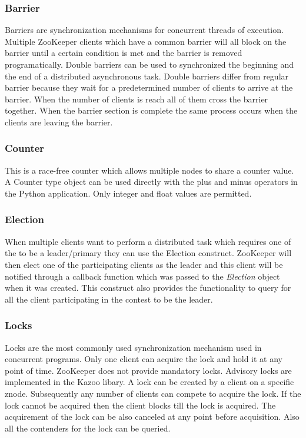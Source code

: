   \subsubsection{Barrier}
    Barriers are synchronization mechanisms for concurrent threads of execution. Multiple ZooKeeper clients which have a common barrier will all block on the barrier until a certain condition is met and the barrier is removed programatically. Double barriers can be used to synchronized the beginning and the end of a distributed asynchronous task. Double barriers differ from regular barrier because they wait for a predetermined number of clients to arrive at the barrier. When the number of clients is reach all of them cross the barrier together. When the barrier section is complete the same process occurs when the clients are leaving the barrier.
  
  \subsubsection{Counter}
  This is a race-free counter which allows multiple nodes to share a counter value. A Counter type object can be used directly with the plus and minus operators in the Python application. Only integer and float values are permitted.
  
  \subsubsection{Election}
  When multiple clients want to perform a distributed task which requires one of the to be a leader/primary they can use the Election construct. ZooKeeper will then elect one of the participating clients as the leader and this client will be notified through a callback function which was passed to the \textit{Election} object when it was created. This construct also provides the functionality to query for all the client participating in the contest to be the leader.
  
  \subsubsection{Locks}
    Locks are the most commonly used synchronization mechanism used in concurrent programs. Only one client can acquire the lock and hold it at any point of time. ZooKeeper does not provide mandatory locks. Advisory locks are implemented in the Kazoo libary. A lock can be created by a client on a specific znode. Subsequently any number of clients can compete to acquire the lock. If the lock cannot be acquired then the client blocks till the lock is acquired. The acquirement of the lock can be also canceled at any point before acquisition. Also all the contenders for the lock can be queried. 
    
